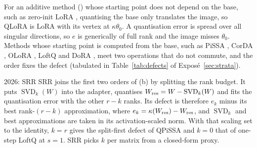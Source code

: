 For an additive method () whose starting point does not depend on the base, such as zero-init
LoRA \citep{hu2021lora}, quantising the base only translates the image, so QLoRA \citep{dettmers2023qlora} is LoRA
with its vertex at $\kappa\theta_0$. A quantisation error is spread over all singular directions, so $e$ is generically
of full rank and the image misses $\theta_0$. Methods whose starting point is computed from the base, such as PiSSA
\citep{meng2024pissa}, CorDA \citep{yang2024corda}, OLoRA \citep{buyukakyuz2024olora}, LoftQ \citep{li2023loftq} and
DoRA \citep{liu2024dora}, meet two operations that do not commute, and the order fixes the defect (tabulated in
Table~\ref{tab:defects} of Exposé~\ref{sec:strata}).

\begin{remark*}{2026: SRR}
SRR \citep{cho2026preserve} joins the first two orders of (b) by splitting the rank budget.
It puts $\operatorname{SVD}_k(W)$ into the adapter, quantises $W_{\rm res}=W-\operatorname{SVD}_k(W)$ and fits the
quantisation error with the other $r-k$ ranks. Its defect is therefore $e_k$ minus its best rank-$(r-k)$
approximation, where $e_k=\kappa(W_{\rm res})-W_{\rm res}$, and $\operatorname{SVD}_k$ and best approximations are taken
in its activation-scaled norm. With that scaling set to the identity, $k=r$ gives the split-first defect of QPiSSA and
$k=0$ that of one-step LoftQ at $s=1$. SRR picks $k$ per matrix from a closed-form proxy.
\end{remark*}

